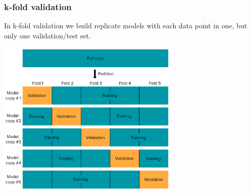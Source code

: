 \begin{frame}
\frametitle{k-fold validation}

In k-fold validation we build replicate models with each data point in one, but only one validation/test set.
\begin{center}
\includegraphics[width=0.65\textwidth]{./images/kfold}
\end{center}

\end{frame}